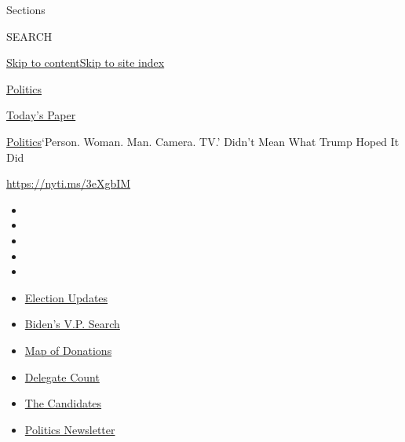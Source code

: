 Sections

SEARCH

\protect\hyperlink{site-content}{Skip to
content}\protect\hyperlink{site-index}{Skip to site index}

\href{https://www.nytimes.com/section/politics}{Politics}

\href{https://myaccount.nytimes.com/auth/login?response_type=cookie\&client_id=vi}{}

\href{https://www.nytimes.com/section/todayspaper}{Today's Paper}

\href{/section/politics}{Politics}\textbar{}`Person. Woman. Man. Camera.
TV.' Didn't Mean What Trump Hoped It Did

\url{https://nyti.ms/3eXgbIM}

\begin{itemize}
\item
\item
\item
\item
\item
\end{itemize}

\begin{itemize}
\item
  \href{https://www.nytimes.com/2020/08/03/us/elections/biden-vs-trump.html?action=click\&pgtype=Article\&state=default\&region=TOP_BANNER\&context=storylines_menu}{Election
  Updates}
\item
  \href{https://www.nytimes.com/article/biden-vice-president-2020.html?action=click\&pgtype=Article\&state=default\&region=TOP_BANNER\&context=storylines_menu}{Biden's
  V.P. Search}
\item
  \href{https://www.nytimes.com/interactive/2020/07/24/us/politics/trump-biden-campaign-donors.html?action=click\&pgtype=Article\&state=default\&region=TOP_BANNER\&context=storylines_menu}{Map
  of Donations}
\item
  \href{https://www.nytimes.com/interactive/2020/us/elections/delegate-count-primary-results.html?action=click\&pgtype=Article\&state=default\&region=TOP_BANNER\&context=storylines_menu}{Delegate
  Count}
\item
  \href{https://www.nytimes.com/interactive/2019/us/politics/2020-presidential-candidates.html?action=click\&pgtype=Article\&state=default\&region=TOP_BANNER\&context=storylines_menu}{The
  Candidates}
\item
  \href{https://www.nytimes.com/newsletters/politics?action=click\&pgtype=Article\&state=default\&region=TOP_BANNER\&context=storylines_menu}{Politics
  Newsletter}
\end{itemize}

